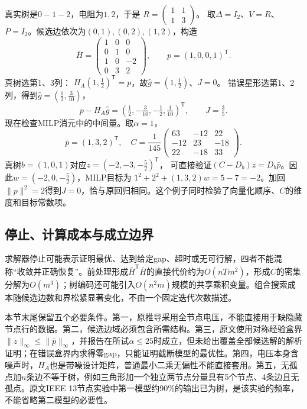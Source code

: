 \begin{example}
真实树是$0-1-2$，电阻为$1,2$，于是
$R=\left(\begin{smallmatrix}1&1\\1&3\end{smallmatrix}\right)$。
取$\Delta=I_2$、$V=R$、$P=I_2$。候选边依次为$(0,1),(0,2),(1,2)$，构造
\[
 \bar H=
 \begin{pmatrix}1&0&0\\0&1&0\\1&0&-2\\0&3&2\end{pmatrix},
 \qquad p=(1,0,0,1)^{\mathsf T}.
\]
真树选第1、3列：
$H_A(1,\tfrac12)^{\mathsf T}=p$，故$\widehat g=(1,\tfrac12)$、$J=0$。
错误星形选第1、2列，得到$\widehat g=(\tfrac12,\tfrac3{10})$，
\[
 p-H_A\widehat g=(\tfrac12,-\tfrac3{10},-\tfrac12,\tfrac1{10})^{\mathsf T},
 \qquad J=\tfrac35.
\]
现在检查MILP消元中的中间量。取$\alpha=1$，
\[
 \bar p=(1,3,2)^{\mathsf T},\quad
 C=\frac1{145}\begin{pmatrix}
 63&-12&22\\-12&23&-18\\22&-18&33
 \end{pmatrix}.
\]
真树$b=(1,0,1)$对应$z=(-2,-3,-\tfrac52)^{\mathsf T}$，
可直接验证$(C-D_b)z=D_b\bar p$。因此$w=(-2,0,-\tfrac52)$，MILP目标为
$1^2+2^2+(1,3,2)w=5-7=-2$。加回$\|p\|^2=2$得到$J=0$，恰与原回归相同。这个例子同时检验了向量化顺序、$C$的维度和目标常数项。
\end{example}

\subsection{停止、计算成本与成立边界}

求解器停止可能表示证明最优、达到给定gap、超时或无可行解，四者不能混称“收敛并正确恢复”。前处理形成$\bar H^{\mathsf T}\bar H$的直接代价约为$O(nTm^2)$，形成$C$的密集分解为$O(m^3)$；树编码还可能引入$O(n^2m)$规模的共享乘积变量。组合搜索成本随候选边数和界松紧显著变化，不由一个固定迭代次数描述。

本节末尾保留五个必要条件。第一，原推导采用全节点电压，不能直接用于缺隐藏节点行的数据。第二，候选边域必须包含所需结构。第三，原文使用对称经验盒界$\|z\|_\infty\leq\|\bar p\|_\infty$，并报告在所试$\alpha\leq25$时成立，但未给出覆盖全部候选解的解析证明；在错误盒界内求得零gap，只能证明截断模型的最优性。第四，电压本身含噪声时，$H_A$也是带噪设计矩阵，普通最小二乘无偏性不能直接套用。第五，无孤点加$n$条边不等于树，例如三角形加一个独立两节点分量具有5个节点、4条边且无孤点。原文IEEE 13节点实验中第一模型约90\%的输出已为树，是该实验的频率，不能省略第二模型的必要性。

